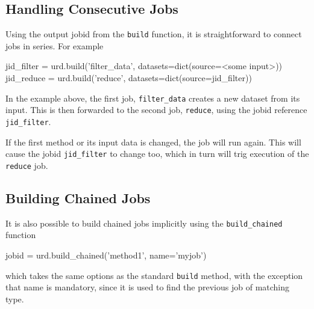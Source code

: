 \subsection{Handling Consecutive Jobs}
Using the output jobid from the \texttt{build} function, it is
straightforward to connect jobs in series.  For example
\begin{python}
  jid_filter = urd.build('filter_data', datasets=dict(source=<some input>))
  jid_reduce = urd.build('reduce', datasets=dict(source=jid_filter))
\end{python}
In the example above, the first job, \texttt{filter\_data} creates a
new dataset from its input.  This is then forwarded to the second job,
\texttt{reduce}, using the jobid reference \texttt{jid\_filter}.

If the first method or its input data is changed, the job will run
again.  This will cause the jobid \texttt{jid\_filter} to change too,
which in turn will trig execution of the \texttt{reduce} job.



\subsection{Building Chained Jobs}
It is also possible to build chained jobs implicitly using the
\texttt{build\_chained} function
\begin{python}
  jobid = urd.build_chained('method1', name='myjob')
\end{python}
which takes the same options as the standard \texttt{build} method,
with the exception that name is mandatory, since it is used to find
the previous job of matching type.

